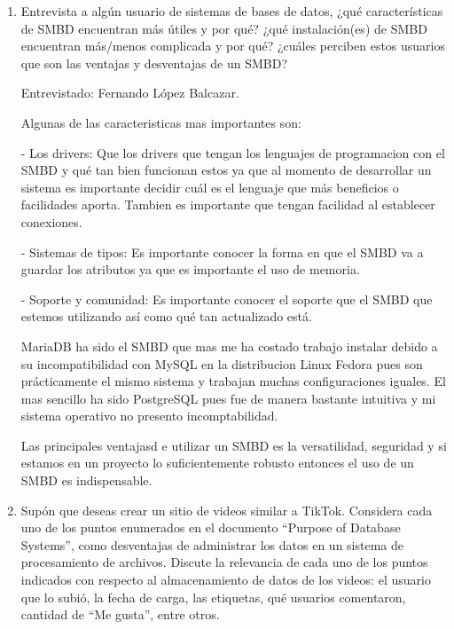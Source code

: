 \documentclass[12pt,a4paper]{article}
\begin{document}
\begin{enumerate}
\begin{enumerate}
			\item Entrevista a algún usuario de sistemas de bases de datos, ¿qué características de SMBD encuentran
				más útiles y por qué? ¿qué instalación(es) de SMBD encuentran más/menos complicada y por qué?
				¿cuáles perciben estos usuarios que son las ventajas y desventajas de un SMBD?
				
			      Entrevistado: Fernando López Balcazar.	
				
			      Algunas de las caracteristicas mas importantes son:
                              
			      - Los drivers:
                              Que los drivers que tengan los lenguajes de programacion con el SMBD y qué tan bien funcionan estos ya que al momento de          		       desarrollar un sistema es importante decidir cuál es el lenguaje que más beneficios o facilidades aporta. Tambien es 				      importante que tengan facilidad al establecer conexiones.

			      - Sistemas de tipos:	
			      Es importante conocer la forma en que el SMBD va a guardar los atributos ya que es importante el uso de memoria.

			      - Soporte y comunidad:
			      Es importante conocer el soporte que el SMBD que estemos utilizando así como qué tan actualizado está.

		              MariaDB ha sido el SMBD que mas me ha costado trabajo instalar debido a su incompatibilidad con MySQL en la distribucion 				      Linux Fedora pues son prácticamente el mismo sistema y trabajan muchas configuraciones iguales. El mas sencillo ha sido 				      PostgreSQL pues fue de manera bastante intuitiva y mi sistema operativo no presento incomptabilidad.

			      Las principales ventajasd e utilizar un SMBD es la versatilidad, seguridad y si estamos en un proyecto lo suficientemente 			      robusto entonces el uso de un SMBD es indispensable.
	
				
			\item Supón que deseas crear un sitio de videos similar a TikTok. Considera cada uno de los puntos
				enumerados en el documento “Purpose of Database Systems”, como desventajas de administrar los
				datos en un sistema de procesamiento de archivos. Discute la relevancia de cada uno de los puntos
				indicados con respecto al almacenamiento de datos de los videos: el usuario que lo subió, la fecha de
				carga, las etiquetas, qué usuarios comentaron, cantidad de “Me gusta”, entre otros.


\end{enumerate}
\end{enumerate}
\end{document}
